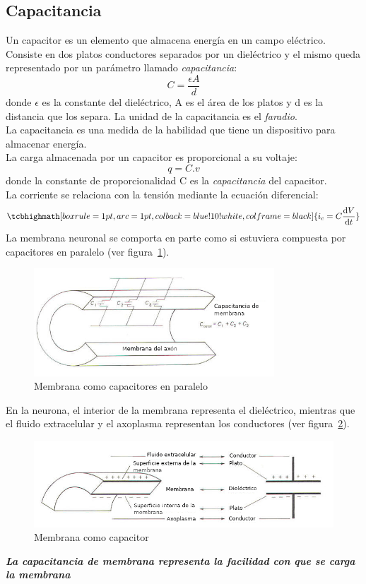 \subsection{Capacitancia}
 Un capacitor es un elemento que almacena energía en un campo eléctrico. Consiste en dos platos conductores separados por un dieléctrico y el mismo queda representado por un parámetro llamado \textit{capacitancia}:
\[C=\frac{\epsilon A}{d}\]
donde $\epsilon$ es la constante del dieléctrico, A es el área de los platos y d es la distancia que los separa. La unidad de la capacitancia es el \textit{faradio}.\\
La capacitancia es una medida de la habilidad que tiene un dispositivo para almacenar energía.\\
La carga almacenada por un capacitor es proporcional a su voltaje:
\[q= C.v\]
donde la constante de proporcionalidad C es la \textit{capacitancia} del capacitor.\\
La corriente se relaciona con la tensión mediante la ecuación diferencial:
\begin{equation}\label{eq:corriente_capacitor}
    \tcbhighmath[boxrule=1pt,arc=1pt,colback=blue!10!white,colframe=black]{i_c= C\dv{V}{t}}
\end{equation}
La membrana neuronal se comporta en parte como si estuviera compuesta por capacitores en paralelo (ver figura~\ref{fig:capacitores_paralelo_membrana}).
\begin{figure}[htbp!]
    \centering
    \includegraphics[width=9.0cm]{figures/capacitancia_membrana.png}
    \caption{Membrana como capacitores en paralelo}
    \label{fig:capacitores_paralelo_membrana}
\end{figure}
En la neurona, el interior de la membrana representa el dieléctrico, mientras que el fluido extracelular y el axoplasma representan los conductores (ver figura~\ref{fig:capacitor_membrana}).
\begin{figure}[htbp!]
    \centering
    \includegraphics[width=11.5cm]{figures/dielectrico_neurona.png}
    \caption{Membrana como capacitor}
    \label{fig:capacitor_membrana}
\end{figure}
\textbf{\emph{La capacitancia de membrana representa la facilidad con que se carga la membrana}}
